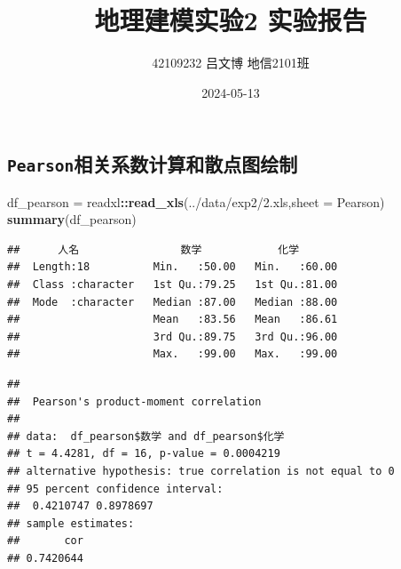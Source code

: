 \documentclass[
]{article}
\title{地理建模实验2 实验报告}
\author{42109232 \quad 吕文博 \quad 地信2101班}
\date{2024-05-13}
\newenvironment{Shaded}{\begin{snugshade}}{\end{snugshade}}
\newcommand{\AttributeTok}[1]{\textcolor[rgb]{0.13,0.29,0.53}{#1}}
\newcommand{\FunctionTok}[1]{\textcolor[rgb]{0.13,0.29,0.53}{\textbf{#1}}}
\newcommand{\NormalTok}[1]{#1}
\newcommand{\OtherTok}[1]{\textcolor[rgb]{0.56,0.35,0.01}{#1}}
\newcommand{\SpecialCharTok}[1]{\textcolor[rgb]{0.81,0.36,0.00}{\textbf{#1}}}
\newcommand{\StringTok}[1]{\textcolor[rgb]{0.31,0.60,0.02}{#1}}
\begin{document}
\maketitle

\subsection{\texorpdfstring{\texttt{Pearson}相关系数计算和散点图绘制}{Pearson相关系数计算和散点图绘制}}\label{pearsonux76f8ux5173ux7cfbux6570ux8ba1ux7b97ux548cux6563ux70b9ux56feux7ed8ux5236}

\begin{Shaded}
\begin{Highlighting}[]
\NormalTok{df\_pearson }\OtherTok{=}\NormalTok{ readxl}\SpecialCharTok{::}\FunctionTok{read\_xls}\NormalTok{(}\StringTok{\textquotesingle{}../data/exp2/2.xls\textquotesingle{}}\NormalTok{,}\AttributeTok{sheet =} \StringTok{\textquotesingle{}Pearson\textquotesingle{}}\NormalTok{)}
\FunctionTok{summary}\NormalTok{(df\_pearson)}
\end{Highlighting}
\end{Shaded}

\begin{verbatim}
##      人名                数学            化学      
##  Length:18          Min.   :50.00   Min.   :60.00  
##  Class :character   1st Qu.:79.25   1st Qu.:81.00  
##  Mode  :character   Median :87.00   Median :88.00  
##                     Mean   :83.56   Mean   :86.61  
##                     3rd Qu.:89.75   3rd Qu.:96.00  
##                     Max.   :99.00   Max.   :99.00
\end{verbatim}

\begin{Shaded}
\end{Shaded}

\begin{verbatim}
## 
##  Pearson's product-moment correlation
## 
## data:  df_pearson$数学 and df_pearson$化学
## t = 4.4281, df = 16, p-value = 0.0004219
## alternative hypothesis: true correlation is not equal to 0
## 95 percent confidence interval:
##  0.4210747 0.8978697
## sample estimates:
##       cor 
## 0.7420644
\end{verbatim}
\end{document}
